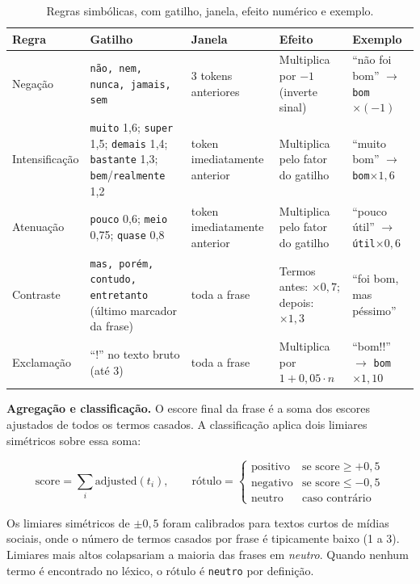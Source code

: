 \documentclass[11pt,a4paper]{article}
\begin{document}
\begin{table}[h]
\small
\centering
\begin{tabularx}{\linewidth}{@{}L{1.9cm}L{3.1cm}L{1.9cm}L{2.6cm}Y@{}}
\toprule
\textbf{Regra} & \textbf{Gatilho} & \textbf{Janela} & \textbf{Efeito} & \textbf{Exemplo} \\
\midrule
Negação & \texttt{não, nem, nunca, jamais, sem} & 3 tokens anteriores & Multiplica por $-1$ (inverte sinal) & ``não foi bom'' $\rightarrow$ \texttt{bom}$\times(-1)$ \\
Intensificação & \texttt{muito} 1{,}6; \texttt{super} 1{,}5; \texttt{demais} 1{,}4; \texttt{bastante} 1{,}3; \texttt{bem}/\texttt{realmente} 1{,}2 & token imediatamente anterior & Multiplica pelo fator do gatilho & ``muito bom'' $\rightarrow$ \texttt{bom}$\times 1{,}6$ \\
Atenuação & \texttt{pouco} 0{,}6; \texttt{meio} 0{,}75; \texttt{quase} 0{,}8 & token imediatamente anterior & Multiplica pelo fator do gatilho & ``pouco útil'' $\rightarrow$ \texttt{útil}$\times 0{,}6$ \\
Contraste & \texttt{mas, porém, contudo, entretanto} (último marcador da frase) & toda a frase & Termos antes: $\times 0{,}7$; depois: $\times 1{,}3$ & ``foi bom, mas péssimo'' \\
Exclamação & ``!'' no texto bruto (até 3) & toda a frase & Multiplica por $1+0{,}05\cdot n$ & ``bom!!'' $\rightarrow$ \texttt{bom}$\times 1{,}10$ \\
\bottomrule
\end{tabularx}
\caption{Regras simbólicas, com gatilho, janela, efeito numérico e exemplo.}
\label{tab:regras}
\end{table}

\textbf{Agregação e classificação.}
O escore final da frase é a soma dos escores ajustados de todos os termos casados. A classificação aplica dois limiares simétricos sobre essa soma:

\begin{equation}
\text{score} = \sum_{i} \text{adjusted}(t_i), \qquad
\text{rótulo} =
\begin{cases}
\text{positivo} & \text{se } \text{score} \geq +0{,}5 \\
\text{negativo} & \text{se } \text{score} \leq -0{,}5 \\
\text{neutro}   & \text{caso contrário}
\end{cases}
\end{equation}

Os limiares simétricos de $\pm 0{,}5$ foram calibrados para textos curtos de mídias sociais, onde o número de termos casados por frase é tipicamente baixo (1 a 3). Limiares mais altos colapsariam a maioria das frases em \emph{neutro}. Quando nenhum termo é encontrado no léxico, o rótulo é \texttt{neutro} por definição.
\end{document}
